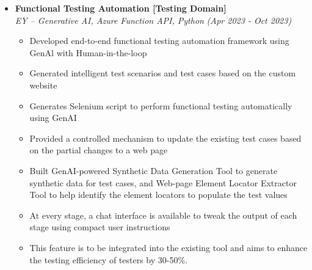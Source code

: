 \documentclass[a4paper,10pt]{article}
\newcommand{\isep}{-2 pt}
\begin{document}
\begin{itemize}
\item \textbf{Functional Testing Automation [Testing Domain]}  \\
    \emph{EY -- Generative AI, Azure Function API, Python} \hfill {\emph{(Apr 2023 - Oct 2023)}}
    \\[-0.5cm]
    \begin{itemize}\itemsep \isep
    	\item Developed end-to-end functional testing automation framework using GenAl with Human-in-the-loop
            \item Generated intelligent test scenarios and test cases based on the custom website
            \item Generates Selenium script to perform functional testing automatically using GenAI
            \item Provided a controlled mechanism to update the existing test cases based on the partial changes to a web page
            \item Built GenAI-powered Synthetic Data Generation Tool to generate synthetic data for test cases, and Web-page Element Locator Extractor Tool to help identify the element locators to populate the test values
            \item At every stage, a chat interface is available to tweak the output of each stage using compact user instructions
            \item This feature is to be integrated into the existing tool and aims to enhance the testing efficiency of testers by 30-50\%.
        \\ [-0.5cm]
    \end{itemize}
 

\end{itemize}
\end{document}
